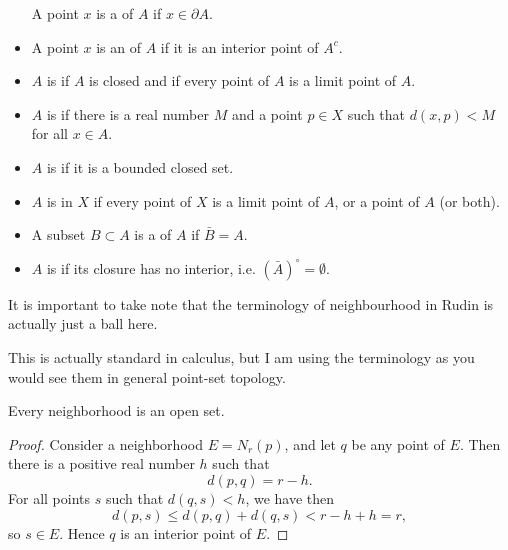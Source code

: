 \begin{itemize}
A point $x$ is a  of $A$ if $x\in\partial A$.

\item A point $x$ is an  of $A$ if it is an interior point of $A^c$.

\item $A$ is  if $A$ is closed and if every point of $A$ is a limit point of $A$.

\item $A$ is  if there is a real number $M$ and a point $p \in X$ such that $d(x,p) < M$ for all $x \in A$.

\item $A$ is  if it is a bounded closed set.

\item $A$ is  in $X$ if every point of $X$ is a limit point of $A$, or a point of $A$ (or both).

\item A subset $B\subset A$ is a  of $A$ if $\bar{B}=A$.

\item $A$ is  if its closure has no interior, i.e. $(\bar{A})^\circ=\emptyset$.
\end{itemize}

\begin{remark}
It is important to take note that the terminology of neighbourhood in Rudin is actually just a ball here.

This is actually standard in calculus, but I am using the terminology as you would see them in general point-set topology.
\end{remark}

\begin{thrm}{}{}
Every neighborhood is an open set.
\end{thrm}

\begin{proof}
Consider a neighborhood $E=N_r(p)$, and let $q$ be any point of $E$. Then there is a positive real number $h$ such that
\[ d(p,q) = r-h. \]
For all points $s$ such that $d(q,s)<h$, we have then
\[ d(p,s) \le d(p,q) + d(q,s) < r - h + h = r, \]
so $s \in E$. Hence $q$ is an interior point of $E$.
\end{proof}

